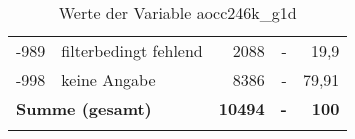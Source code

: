 \begin{longtable}{Xlrrr}
       -989 & filterbedingt fehlend & 2088 & - & 19,9 \\

       -998 & keine Angabe & 8386 & - & 79,91 \\

     \midrule
     \multicolumn{2}{l}{\textbf{Summe (gesamt)}} & \textbf{10494} & \textbf{-} & \textbf{100} \\
     \bottomrule
     \caption{Werte der Variable aocc246k\_g1d}
     \end{longtable}
     
